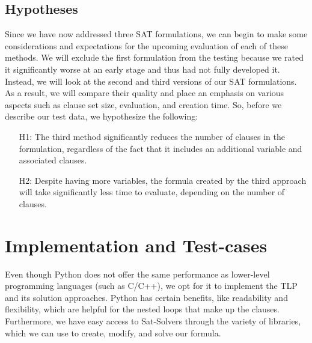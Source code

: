 \documentclass[bachelor, english]{algothesis}
\begin{document}
\section{Hypotheses}
Since we have now addressed three SAT formulations, we can begin to make some considerations and expectations for the upcoming evaluation of each of these methods. We will exclude the first formulation from the testing because we rated it significantly worse at an early stage and thus had not fully developed it. Instead, we will look at the second and third versions of our SAT formulations. As a result, we will compare their quality and place an emphasis on various aspects such as clause set size, evaluation, and creation time. So, before we describe our test data, we hypothesize the following:

\begin{enumerate}
    \item[H1:] The third method significantly reduces the number of clauses in the formulation, regardless of the fact that it includes an additional variable and associated clauses.
    \item[H2:] Despite having more variables, the formula created by the third approach will take significantly less time to evaluate, depending on the number of clauses.
\end{enumerate}


\chapter{Implementation and Test-cases}
Even though Python does not offer the same performance as lower-level programming languages (such as C/C++), we opt for it to implement the TLP and its solution approaches. Python has certain benefits, like readability and flexibility, which are helpful for the nested loops that make up the clauses. Furthermore, we have easy access to Sat-Solvers through the variety of libraries, which we can use to create, modify, and solve our formula.
\end{document}
